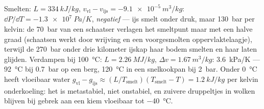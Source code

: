 \begin{example}\label{ex:b2:thermodynamic-potentials:water}
Smelten: $L = \qty{334}{kJ/kg}$,
$v_{\text{vl}} - v_{\text{ijs}} = -\qty{9.1e-5}{m^3/kg}$:
$\dd P/\dd T = \qty{-1.3e7}{Pa/K}$, \emph{negatief} --- ijs smelt onder
druk, maar \qty{130}{bar} per kelvin: de \qty{70}{bar} van een schaatser verlagen
het smeltpunt maar met een halve graad (schaatsen werkt door wrijving en
een voorgesmolten oppervlaktelaagje), terwijl de \qty{270}{bar} onder drie
kilometer ijskap haar bodem smelten en haar laten glijden. Verdampen bij
\qty{100}{\celsius}: $L = \qty{2.26}{MJ/kg}$, $\Delta v = \qty{1.67}{m^3/kg}$:
\qty{3.6}{kPa/K} --- \qty{92}{\celsius} bij \qty{0.7}{bar} op een berg,
\qty{120}{\celsius} in een snelkookpan bij \qty{2}{bar}. Onder
\qty{0}{\celsius} heeft vloeibaar water
$g_{\text{vl}} - g_{\text{ijs}} \approx
(L/T_{\text{smelt}})(T_{\text{smelt}} - T) = \qty{1.2}{kJ/kg}$
per kelvin
onderkoeling: het is metastabiel, niet onstabiel, en zuivere druppeltjes in
wolken blijven bij gebrek aan een kiem vloeibaar tot \qty{-40}{\celsius}.
\end{example}


